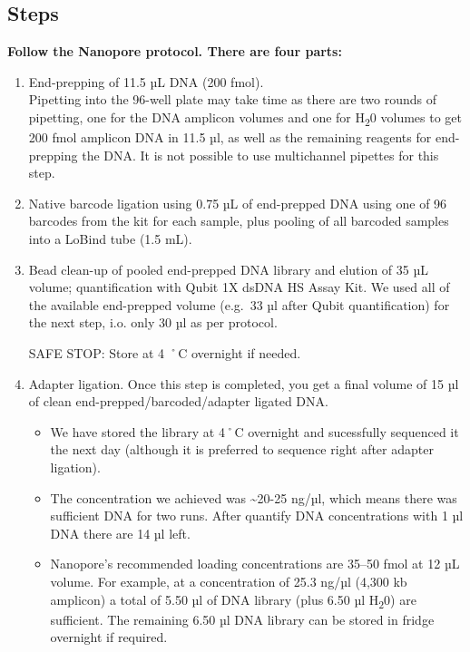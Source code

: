 \documentclass[
]{book}
\begin{document}
\subsection{Steps}\label{steps-2}

\textbf{Follow the Nanopore protocol. There are four parts:}

\begin{enumerate}
\def\labelenumi{\arabic{enumi}.}
\item
  End-prepping of 11.5 µL DNA (200 fmol).\\
  Pipetting into the 96-well plate may take time as there are two rounds of pipetting, one for the DNA amplicon volumes and one for H\textsubscript{2}0 volumes to get 200 fmol amplicon DNA in 11.5 µl, as well as the remaining reagents for end-prepping the DNA. It is not possible to use multichannel pipettes for this step.
\item
  Native barcode ligation using 0.75 µL of end-prepped DNA using one of 96 barcodes from the kit for each sample, plus pooling of all barcoded samples into a LoBind tube (1.5 mL).
\item
  Bead clean-up of pooled end-prepped DNA library and elution of 35 µL volume; quantification with Qubit 1X dsDNA HS Assay Kit. We used all of the available end-prepped volume (e.g.~33 µl after Qubit quantification) for the next step, i.o. only 30 µl as per protocol.

  SAFE STOP: Store at 4 ˚C overnight if needed.
\item
  Adapter ligation. Once this step is completed, you get a final volume of 15 µl of clean end-prepped/barcoded/adapter ligated DNA.

  \begin{itemize}
  \item
    We have stored the library at 4˚C overnight and sucessfully sequenced it the next day (although it is preferred to sequence right after adapter ligation).
  \item
    The concentration we achieved was \textasciitilde20-25 ng/µl, which means there was sufficient DNA for two runs. After quantify DNA concentrations with 1 µl DNA there are 14 µl left.
  \item
    Nanopore's recommended loading concentrations are 35--50 fmol at 12 µL volume. For example, at a concentration of 25.3 ng/µl (4,300 kb amplicon) a total of 5.50 µl of DNA library (plus 6.50 µl H\textsubscript{2}0) are sufficient. The remaining 6.50 µl DNA library can be stored in fridge overnight if required.
  \end{itemize}
\end{enumerate}
\end{document}

